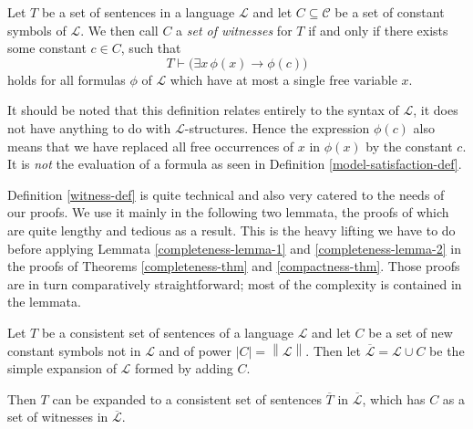 \documentclass[../../main.tex]{subfiles}
\begin{document}
\begin{definition}\label{witness-def}\cite[p.61]{Cha90}
    Let $T$ be a set of sentences in a language $\mathcal{L}$ and let $C \subseteq \mathcal{C}$ be a set of constant symbols of $\mathcal{L}$.
    We then call $C$ a \emph{set of witnesses} for $T$ if and only if there exists some constant $c \in C$, such that
    $$T \vdash \big(\exists x \, \phi(x) \rightarrow \phi(c)\big)$$
    holds for all formulas $\phi$ of $\mathcal{L}$ which have at most a single free variable $x$.
\end{definition}

It should be noted that this definition relates entirely to the syntax of $\mathcal{L}$, it does not have anything to do with $\mathcal{L}$-structures.
Hence the expression $\phi(c)$ also means that we have replaced all free occurrences of $x$ in $\phi(x)$ by the constant $c$.
It is \emph{not} the evaluation of a formula as seen in Definition \ref{model-satisfaction-def}.

Definition \ref{witness-def} is quite technical and also very catered to the needs of our proofs.
We use it mainly in the following two lemmata, the proofs of which are quite lengthy and tedious as a result.
This is the heavy lifting we have to do before applying Lemmata \ref{completeness-lemma-1} and \ref{completeness-lemma-2} in the proofs of Theorems \ref{completeness-thm} and \ref{compactness-thm}.
Those proofs are in turn comparatively straightforward; most of the complexity is contained in the lemmata.

\begin{lemma}\label{completeness-lemma-1}\cite[Lemma 2.1.1]{Cha90}
    Let $T$ be a consistent set of sentences of a language $\mathcal{L}$ and   
    let $C$ be a set of new constant symbols not in $\mathcal{L}$ and of power $\left\lvert C \right\rvert = \left\lVert \mathcal{L} \right\rVert$.
    Then let $\overline{\mathcal{L}} = \mathcal{L} \cup C$ be the simple expansion of $\mathcal{L}$ formed by adding $C$.
    
    Then $T$ can be expanded to a consistent set of sentences $\overline{T}$ in $\overline{\mathcal{L}}$, which has $C$ as a set of witnesses in $\overline{\mathcal{L}}$.
\end{lemma}
\end{document}
